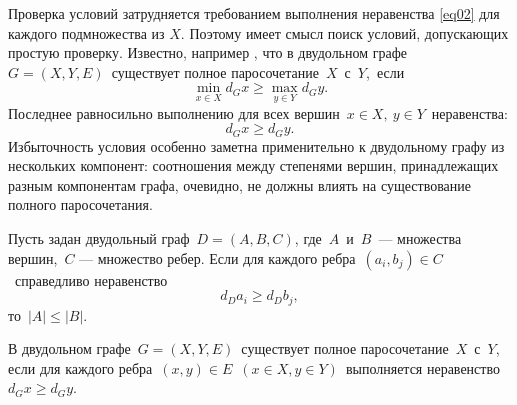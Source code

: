 Проверка условий затрудняется требованием выполнения неравенства \eqref{eq02} для каждого подмножества из $X$. Поэтому имеет смысл поиск условий, допускающих простую проверку. Известно, например \cite[c.\,165]{akm-1}, что в двудольном графе \ ${G=(X,Y,E)}$\  существует полное паросочетание\ $X$\  с\ $Y$,\ если
$$
\min_{x\in X} d_{G}x\geqslant \max_{y\in Y}d_{G}y.
$$
Последнее равносильно выполнению для всех вершин\ ${x\in X},\ {y\in Y}$\ неравенства:
$$
d_G x\geqslant d_G y.
$$
Избыточность условия особенно заметна применительно к двудольному графу из нескольких компонент: соотношения между степенями вершин, принадлежащих разным компонентам графа, очевидно, не должны влиять на существование полного паросочетания.
\par\medskip
\begin{lemma}\label{lem01}
Пусть задан двудольный граф\ ${D=(A,B,C)}$, где\ $A$\ и\ $B$\ --- множества вершин,\ $C$ --- множество ребер. Если для каждого ребра\ $(a_i,b_j)\in C$\ справедливо неравенство\
\begin{equation}\label {eq00}
d_D a_i\geqslant d_D b_j,
\end{equation}
то\ $|A|\leqslant |B|$.
\end{lemma}
\begin{theorem}\label{the01}
В двудольном графе\ $G=(X,Y,E)$\ существует полное паросочетание\ $X$\ с\ $Y$, если для каждого ребра\ $(x,y)\in E$\  $(x\in X, y\in Y)$\ выполняется неравенство\ $d_G x\geqslant d_G y$.
\end{theorem}

